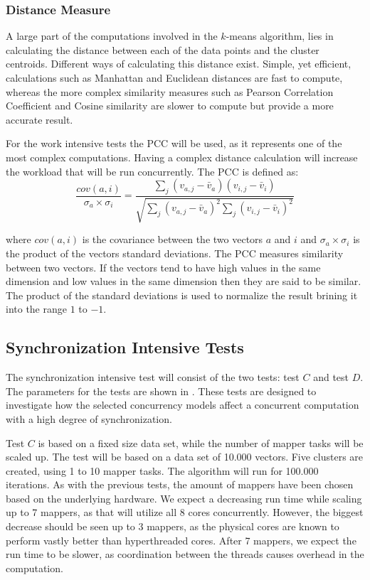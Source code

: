 \subsubsection{Distance Measure}
A large part of the computations involved in the $k$-means algorithm, lies in calculating the distance between each of the data points and the cluster centroids. Different ways of calculating this distance exist. Simple, yet efficient, calculations such as Manhattan and Euclidean\cite[p. 41]{amatriain2011data} distances are fast to compute, whereas the more complex similarity measures such as Pearson Correlation Coefficient and Cosine similarity\cite[p. 42]{amatriain2011data}\cite{breese1998empirical} are slower to compute but provide a more accurate result.

For the work intensive tests the \ac{PCC} will be used, as it represents one of the most complex computations. Having a complex distance calculation will increase the workload that will be run concurrently. The \ac{PCC} is defined as\cite[p. 4]{breese1998empirical}:
\begin{equation}\label{pearsonverbose}
\frac{cov(a,i)}{\sigma_a \times \sigma_i} = \frac{\sum_j(v_{a,j}-\bar{v}_a)(v_{i,j}-\bar{v}_i)}{\sqrt{{\sum_j}(v_{a,j}-\bar{v}_a)^2 \sum_j(v_{i,j}-\bar{v}_i)^2}}
\end{equation}

where $cov(a,i)$ is the covariance between the two vectors $a$ and $i$ and $\sigma_a \times \sigma_i$ is the product of the vectors standard deviations. The \ac{PCC} measures similarity between two vectors. If the vectors tend to have high values in the same dimension and low values in the same dimension then they are said to be similar. The product of the standard deviations is used to normalize the result brining it into the range $1$ to $-1$. 

\subsection{Synchronization Intensive Tests}
\label{sec:performance_sync_intensive_desc}
The synchronization intensive test will consist of the two tests: test $C$ and test $D$. The parameters for the tests are shown in . These tests are designed to investigate how the selected concurrency models affect a concurrent computation with a high degree of synchronization. 

Test $C$ is based on a fixed size data set, while the number of mapper tasks will be scaled up.  The test will be based on a data set of 10.000 vectors. Five clusters are created, using 1 to 10 mapper tasks. The algorithm will run for 100.000 iterations. As with the previous tests, the amount of mappers have been chosen based on the underlying hardware. We expect a decreasing run time while scaling up to 7 mappers, as that will utilize all 8 cores concurrently. However, the biggest decrease should be seen up to 3 mappers, as the physical cores are known to perform vastly better than hyperthreaded cores\cite{marr2002hyper}. After 7 mappers, we expect the run time to be slower, as coordination between the threads causes overhead in the computation.

